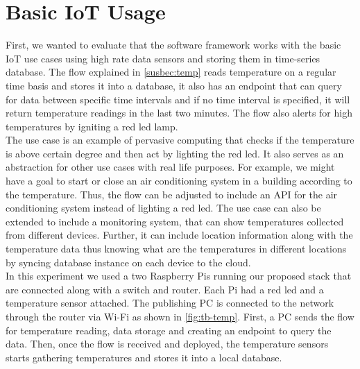 \section{Basic IoT Usage}

First, we wanted to evaluate that the software framework works with the basic IoT use cases using high rate data sensors and storing them in time-series database. The flow explained in \ref{susbec:temp}  reads temperature on a regular time basis and stores it into a database, it also has an endpoint that can query for data between specific time intervals and if no time interval is specified, it will return temperature readings in the last two minutes. The flow also alerts for high temperatures by igniting a red led lamp. \\

\noindent The use case is an example of pervasive computing that checks if the temperature is above certain degree and then act by lighting the red led. It also serves as an abstraction for other use cases with real life purposes. For example, we might have a goal to start or close an air conditioning system in a building according to the temperature. Thus, the flow can be adjusted to include an API for the air conditioning system instead of lighting a red led. The use case can also be extended to include a monitoring system, that can show temperatures collected from different devices. Further, it can include location information along with the temperature data thus knowing what are the temperatures in different locations by syncing database instance on each device to the cloud.\\

\noindent In this experiment we used a two Raspberry Pis running our proposed stack that are connected along with a switch and router. Each Pi had a red led and a temperature sensor attached. The publishing PC is connected to the network through the router via Wi-Fi as shown in \ref{fig:tb-temp}. First, a PC sends the flow for temperature reading, data storage and creating an endpoint to query the data. Then, once the flow is received and deployed, the temperature sensors starts gathering temperatures and stores it into a local database. 

